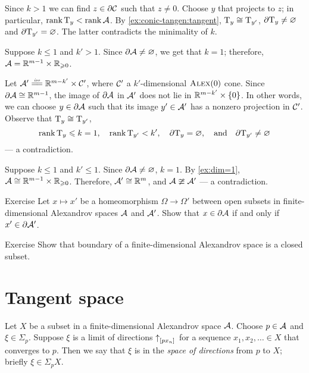 Since $k>1$ we can find $z\in\partial\mathcal{C}$ such that $z\ne 0$.
Choose $y$ that projects to $z$;
in particular, $\operatorname{\rm rank}\nolimits\mathrm{T}_y<\operatorname{\rm rank}\nolimits\mathcal{A}$.
By \ref{ex:conic-tangen:tangent}, $\mathrm{T}_y\cong\mathrm{T}_{y'}$,
$\partial  \mathrm{T}_y\ne\varnothing$ and $\partial \mathrm{T}_{y'}=\varnothing$.
The latter contradicts the minimality of $k$.

 Suppose $k\le1$ and $k'>1$.
Since $\partial \mathcal{A}\ne \varnothing$, we get that $k=1$;
therefore, $\mathcal{A}=\mathbb{R}^{m-1}\times\mathbb{R}_{\geqslant0}$.

Let $\spc{A}'\iso \RR^{m-k'}\times \spc{C}'$, where $\mathcal{C}'$ a $k'$-dimensional $\textsc{Alex}(0)$ cone.
Since $\partial\mathcal{A}\cong\mathbb{R}^{m-1}$,
the image of $\partial\mathcal{A}$ in $\mathcal{A}'$ does not lie in $\mathbb{R}^{m-k'}\times\{0\}$.
In other words, we can choose $y\in \partial \mathcal{A}$ such that its image $y'\in \mathcal{A}'$ has a nonzero projection in $\mathcal{C}'$.
Observe that $\mathrm{T}_y\cong\mathrm{T}_{y'}$,
\[
\operatorname{\rm rank}\nolimits\mathrm{T}_y\leqslant k=1,
\quad
\operatorname{\rm rank}\nolimits\mathrm{T}_{y'}< k',
\quad
\partial \mathrm{T}_y=\varnothing,
\quad\text{and}\quad
\partial \mathrm{T}_{y'}\ne \varnothing\]
--- a contradiction.

Suppose $k\le 1$ and $k'\le 1$.
Since $\partial \mathcal{A}\ne \varnothing$, $k=1$.
By \ref{ex:dim=1}, $\mathcal{A}\cong \mathbb{R}^{m-1}\times\mathbb{R}_{\geqslant0}$.
Therefore, $\mathcal{A}'\cong\mathbb{R}^m$, and $\mathcal{A}\ncong\mathcal{A}'$ --- a contradiction.
\qeds

\begin{thm}{Exercise}\label{ex:bry2bry}
Let $x\mapsto x'$ be a homeomorphism $\Omega\to\Omega'$
between open subsets in finite-dimensional Alexandrov spaces $\mathcal{A}$ and $\mathcal{A}'$.
Show that $x\in \partial \mathcal{A}$ if and only if $x'\in \partial \mathcal{A}'$.

\end{thm}

\begin{thm}{Exercise}\label{ex:bry-closed}
Show that boundary of a finite-dimensional Alexandrov space is a closed subset.
\end{thm}

\section{Tangent space}

Let $X$ be a subset in a finite-dimensional Alexandrov space $\mathcal{A}$.
Choose $p\in \mathcal{A}$ and $\xi\in \Sigma_p$.
Suppose $\xi$ is a limit of directions ${\uparrow}_{[{p}{x_n}]_{{}}}$ for a sequence $x_1,x_2,\dots{}\in X$ that converges to $p$.
Then we say that $\xi$ is in the \emph{space of directions} from $p$ to $X$;
briefly $\xi\in\Sigma_pX$.

